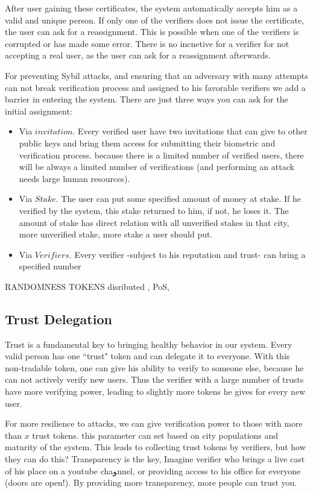 \documentclass[conference]{IEEEtran}
\begin{document}
After user gaining these certificates, the system automatically accepts him as a valid and unique person. If only one of the verifiers does not issue the certificate, the user can ask for a reassignment. This is possible when one of the verifiers is corrupted or has made some error. There is no incnetive for a verifier for  not accepting a real user, as the user can ask for a reassignment afterwards.


For preventing Sybil attacks, and  ensuring that an adversary with many attempts can not break verification process and assigned to his favorable verifiers we add a barrier in entering the system. There are just three ways you can ask for the initial assignment:
\begin{itemize}
\item Via $invitation$. Every verified user have two invitations that can give to other public keys and bring them access for submitting their biometric and verification process. because there is a limited number of verified users, there will be always a limited number of verifications (and performing an attack needs large human resources).

\item Via $Stake$. The user can put some specified amount of money at stake. If he verified by the system, this stake returned to him, if not, he loses it. The amount of stake has direct relation with all unverified stakes in that city, more unverified stake, more stake a user should put.

\item Via $Verifiers$. Every verifier -subject to his reputation and trust- can bring a specified number  
\end{itemize}
RANDOMNESS TOKENS disributed , PoS, 

\subsection{Trust Delegation}
Trust is a fundamental key to bringing healthy behavior in our system. Every valid person has one ``trust" token and can delegate it to everyone. With this non-tradable token, one can give his ability to verify to someone else, because he can not actively verify new users. Thus the verifier with a large number of trusts have more verifying power, leading to slightly more tokens he gives for every new user.


For more resilience to attacks, we can give verification power to those with more than $x$ trust tokens. this parameter can set based on city populations and maturity of the system. This leads to collecting trust tokens by verifiers, but how they can do this? Transparency is the key, Imagine verifier who brings a live cast of his place on a youtube chaوnnel, or providing access to his office for everyone (doors are open!). By providing more transparency, more people can trust you.
\end{document}
